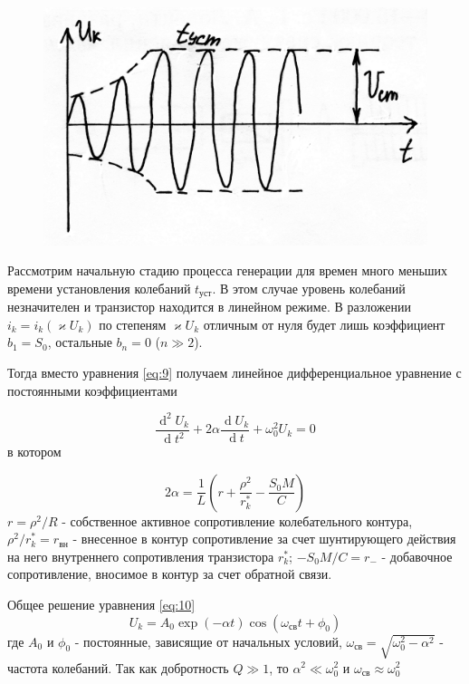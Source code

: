 \begin{figure}
\includegraphics[width=\linewidth]{circuit/fig13}
\caption{}
\label{fig:figure13}
\vspace{-20pt}
\end{figure}

Рассмотрим начальную стадию процесса генерации для времен много меньших времени установления колебаний $t_\text{уст}$. В этом случае уровень колебаний незначителен и транзистор находится в линейном режиме. В разложении $i_k=i_k(\varkappa U_k)$ по степеням $\varkappa U_k$ отличным от нуля будет лишь коэффициент $b_1=S_0$, остальные $b_n=0$ ($n\gg2$).

Тогда вместо уравнения \eqref{eq:9} получаем линейное дифференциальное уравнение с постоянными коэффициентами

\begin{equation}
\frac{\operatorname d^2U_k}{\operatorname dt^2}+2\alpha \frac{\operatorname d U_k}{\operatorname dt}+\omega_0^2U_k=0
\label{eq:10}
\end{equation}
в котором

\begin{equation}
2\alpha=\frac{1}{L}(r+\frac{\rho^2}{r_k^*}-\frac{S_0M}{C})
\label{eq:11}
\end{equation}
$\displaystyle r=\rho^2/R$ - собственное активное сопротивление колебательного контура, $\displaystyle \rho^2/r_k^*=r_\text{вн}$ - внесенное в контур сопротивление за счет шунтирующего действия на него внутреннего сопротивления транзистора $r_k^*$; $-S_0M/C=r_{-}$ - добавочное сопротивление, вносимое в контур за счет обратной связи. 

Общее решение уравнения \eqref{eq:10}
\begin{equation*}
U_k=A_0\exp(-\alpha t)\cos(\omega_\text{св}t+\phi_0)
\end{equation*}
где $A_0$ и $\phi_0$ - постоянные, зависящие от начальных условий, $\omega_\text{св}=\sqrt{\omega_0^2-\alpha^2}$ - частота колебаний. Так как добротность $Q\gg1$, то $\alpha^2\ll \omega_0^2$ и $\omega_\text{св}\approx\omega_0^2$

